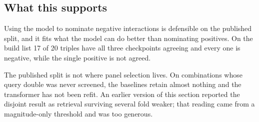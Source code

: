 \subsection{What this supports}

Using the model to nominate negative interactions is defensible on the published
split, and it fits what the model can do better than nominating positives. On the
build list 17 of 20 triples have all three checkpoints agreeing and every one is
negative, while the single positive is not agreed.

The published split is not where panel selection lives. On combinations whose
query double was never screened, the baselines retain almost nothing and the
transformer has not been refit. An earlier version of this section reported the
disjoint result as retrieval surviving several fold weaker; that reading came
from a magnitude-only threshold and was too generous.
